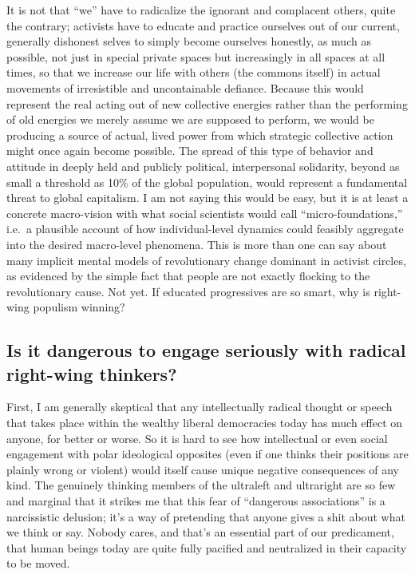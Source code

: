 \documentclass[a4paper,12pt,margin=.5in]{article}
\begin{document}
It is not that ``we'' have to radicalize the ignorant and complacent
others, quite the contrary; activists have to educate and practice
ourselves out of our current, generally dishonest selves to simply
become ourselves honestly, as much as possible, not just in special
private spaces but increasingly in all spaces at all times, so that we
increase our life with others (the commons itself) in actual movements
of irresistible and uncontainable defiance. Because this would represent
the real acting out of new collective energies rather than the
performing of old energies we merely assume we are supposed to perform,
we would be producing a source of actual, lived power from which
strategic collective action might once again become possible. The spread
of this type of behavior and attitude in deeply held and publicly
political, interpersonal solidarity, beyond as small a threshold as 10\%
of the global population, would represent a fundamental threat to global
capitalism. I am not saying this would be easy, but it is at least a
concrete macro-vision with what social scientists would call
``micro-foundations,'' i.e.~a plausible account of how individual-level
dynamics could feasibly aggregate into the desired macro-level
phenomena. This is more than one can say about many implicit mental
models of revolutionary change dominant in activist circles, as
evidenced by the simple fact that people are not exactly flocking to the
revolutionary cause. Not yet. If educated progressives are so smart, why
is right-wing populism winning?

\subsection{Is it dangerous to engage seriously with radical right-wing
thinkers?}\label{is-it-dangerous-to-engage-seriously-with-radical-right-wing-thinkers}

First, I am generally skeptical that any intellectually radical thought
or speech that takes place within the wealthy liberal democracies today
has much effect on anyone, for better or worse. So it is hard to see how
intellectual or even social engagement with polar ideological opposites
(even if one thinks their positions are plainly wrong or violent) would
itself cause unique negative consequences of any kind. The genuinely
thinking members of the ultraleft and ultraright are so few and marginal
that it strikes me that this fear of ``dangerous associations'' is a
narcissistic delusion; it's a way of pretending that anyone gives a shit
about what we think or say. Nobody cares, and that's an essential part
of our predicament, that human beings today are quite fully pacified and
neutralized in their capacity to be moved.
\end{document}
